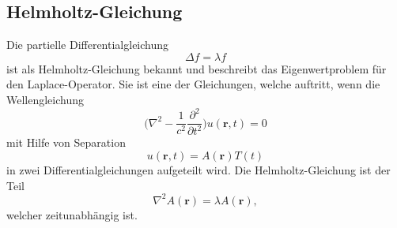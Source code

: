 \subsection{Helmholtz-Gleichung}
Die partielle Differentialgleichung 
\begin{equation}
	\Delta f = \lambda f
\end{equation}
ist als Helmholtz-Gleichung bekannt und beschreibt das Eigenwertproblem für den Laplace-Operator. 
%
Sie ist eine der Gleichungen, welche auftritt, wenn die Wellengleichung
%
\begin{equation}
	\biggl(
	\nabla^2 - \frac{1}{c^2}\frac{\partial^2}{\partial t^2}
	\biggr) u(\textbf{r},t)
	=
	0 
\end{equation}
mit Hilfe von Separation
%
\begin{equation}
	u(\textbf{r},t) = A(\textbf{r})T(t)
\end{equation} 
in zwei Differentialgleichungen aufgeteilt wird.
Die Helmholtz-Gleichung ist der Teil
\begin{equation}
	\nabla^2 A(\textbf{r}) = \lambda A(\textbf{r}),
\end{equation}
welcher zeitunabhängig ist.

